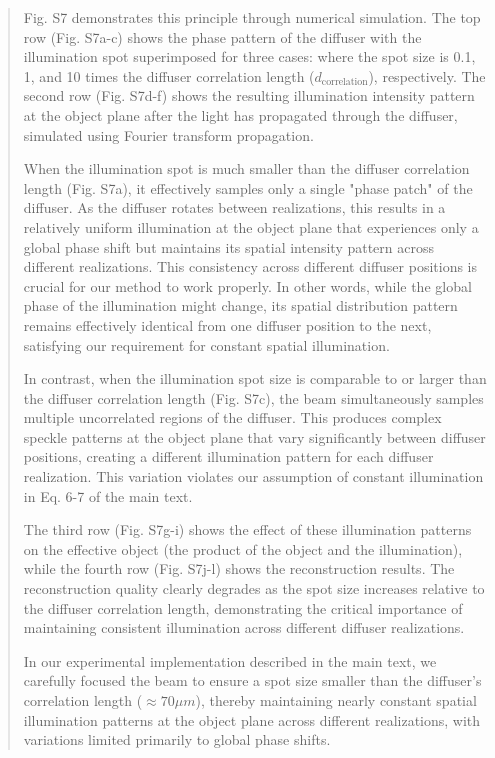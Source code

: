\documentclass[12pt]{article}
\newenvironment{ourresponse}
    {\begin{tcolorbox}[width=\linewidth,breakable,enhanced,colback=gray!5,colframe=responsecolor!50,title=Response,left=5pt,right=5pt]}
    {\end{tcolorbox}}
\begin{document}
\begin{enumerate}[label=\arabic*.]
\begin{enumerate}[label=3.\alph*.]
\begin{ourresponse}
\begin{quote}
        Fig. S7 demonstrates this principle through numerical simulation. The top row (Fig. S7a-c) shows the phase pattern of the diffuser with the illumination spot superimposed for three cases: where the spot size is 0.1, 1, and 10 times the diffuser correlation length ($d_{\text{correlation}}$), respectively. The second row (Fig. S7d-f) shows the resulting illumination intensity pattern at the object plane after the light has propagated through the diffuser, simulated using Fourier transform propagation.
        
        When the illumination spot is much smaller than the diffuser correlation length (Fig. S7a), it effectively samples only a single "phase patch" of the diffuser. As the diffuser rotates between realizations, this results in a relatively uniform illumination at the object plane that experiences only a global phase shift but maintains its spatial intensity pattern across different realizations. This consistency across different diffuser positions is crucial for our method to work properly. In other words, while the global phase of the illumination might change, its spatial distribution pattern remains effectively identical from one diffuser position to the next, satisfying our requirement for constant spatial illumination.
        
        In contrast, when the illumination spot size is comparable to or larger than the diffuser correlation length (Fig. S7c), the beam simultaneously samples multiple uncorrelated regions of the diffuser. This produces complex speckle patterns at the object plane that vary significantly between diffuser positions, creating a different illumination pattern for each diffuser realization. This variation violates our assumption of constant illumination in Eq. 6-7 of the main text.
        
        The third row (Fig. S7g-i) shows the effect of these illumination patterns on the effective object (the product of the object and the illumination), while the fourth row (Fig. S7j-l) shows the reconstruction results. The reconstruction quality clearly degrades as the spot size increases relative to the diffuser correlation length, demonstrating the critical importance of maintaining consistent illumination across different diffuser realizations.
        
        In our experimental implementation described in the main text, we carefully focused the beam to ensure a spot size smaller than the diffuser's correlation length ($\approx 70 \mu m$), thereby maintaining nearly constant spatial illumination patterns at the object plane across different realizations, with variations limited primarily to global phase shifts.
        \end{quote}
        

\end{ourresponse}
\end{enumerate}
\end{enumerate}
\end{document}
